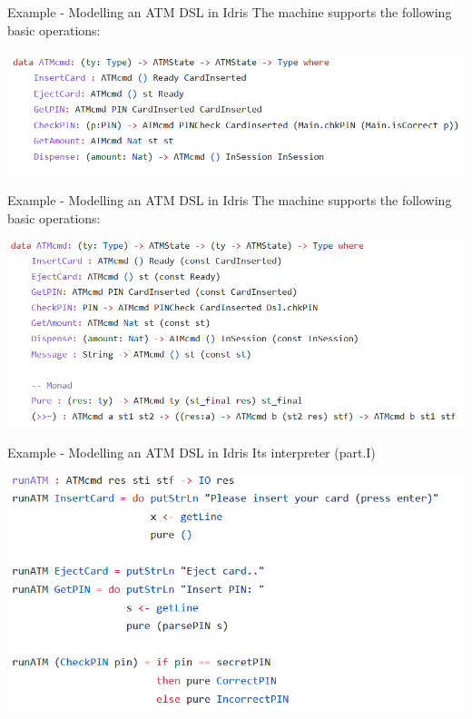 \documentclass{beamer}
\newcommand{\dsltitle}{Example - Modelling an ATM DSL in Idris}
\begin{document}
\begin{frame}[fragile]{\dsltitle}
The machine supports the following basic operations:
\begin{center}
	\includegraphics[width=\textwidth]{pics/dsl-code-2}
\end{center}
\end{frame}

\begin{frame}[fragile]{\dsltitle}
The machine supports the following basic operations:
\begin{center}
	\includegraphics[width=\textwidth]{pics/dsl-code-3}
\end{center}
\end{frame}

\begin{frame}[fragile]{\dsltitle}
Its interpreter (part.I)
\begin{center}
	\includegraphics[width=\textwidth]{pics/dsl-code-4_1}
\end{center}
\end{frame}
\end{document}
